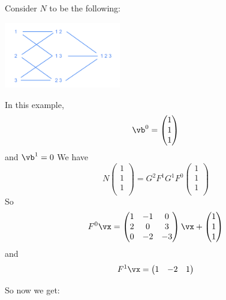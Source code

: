 \begin{example}
    Consider $N$ to be the following:\\
    \begin{center}
    \includegraphics[width=2in]{images/Chapter 10/P123.png}
    \end{center}
    
     In this example, $${\vb}^{0} = \begin{pmatrix}1\\1\\1\\
        \end{pmatrix}$$ and ${\vb}^{1} = 0$
    We have $$N\begin{pmatrix}1\\1\\1\\
        \end{pmatrix} = G^{2}F^{1}G^{1}F^{0}\begin{pmatrix}1\\1\\1\\
        \end{pmatrix}$$
        So
        $$F^{0}{\vx} = \begin{pmatrix}1 & -1 & 0\\2 & 0 & 3\\0 & -2 & -3\\
        \end{pmatrix}{\vx}  + \begin{pmatrix}1\\1\\1\\
        \end{pmatrix}$$
        and
        $$F^{1}{\vx} = \begin{pmatrix}
        1 & -2 & 1
        \end{pmatrix}$$

    So now we get:
    

\end{example}
